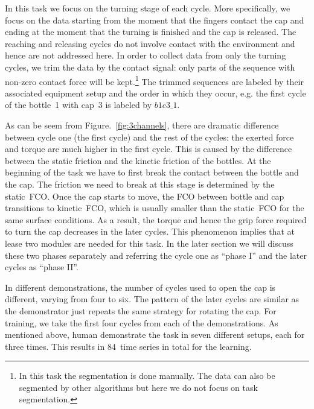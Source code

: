 In this task we focus on the turning stage of each cycle. More
specifically, we focus on the data starting from the moment that the
fingers contact the cap and ending at the moment that the turning is
finished and the cap is released. The reaching and releasing cycles do
not involve contact with the environment and hence are not addressed
here.
In order to collect data from only the turning cycles, we trim the
data by the contact signal: only parts of the sequence with non-zero
contact force will be kept.\footnote{In this task the segmentation is
  done manually. The data can also be segmented by other algorithms
  but here we do not focus on task segmentation.} The trimmed
sequences are labeled by their associated equipment setup and the
order in which they occur, e.g. the first cycle of the bottle~1 with
cap~3 is labeled by $b1c3\_1$.

As can be seem from Figure.~\ref{fig:3channels}, there are dramatic
difference between cycle one (the first cycle) and the rest of the
cycles: the exerted force and torque are much higher in the first
cycle. This is caused by the difference between the static friction
and the kinetic friction of the bottles. At the beginning of the task
we have to first break the contact between the bottle and the cap. The
friction we need to break at this stage is determined by the
static~FCO. Once the cap starts to move, the FCO between bottle and
cap transitions to kinetic~FCO, which is usually smaller than the
static~FCO for the same surface conditions. As a result, the torque and
hence the grip force required to turn the cap decreases in the later
cycles. This phenomenon implies that at lease two modules are needed
for this task. In the later section we will discuss these two phases
separately and referring the cycle one as ``phase I'' and the later cycles
as ``phase II''.

In different demonstrations, the number of cycles used to open the cap
is different, varying from four to six. The pattern of the later
cycles are similar as the demonstrator just repeats the same strategy
for rotating the cap. For training, we take the first four cycles from
each of the demonstrations. As mentioned above, human demonstrate the task in seven different setups, each for three times. This results in 84~time series in total for the learning.

